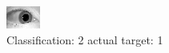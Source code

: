 \begin{figure}[h!]
\begin{center}
\includegraphics[width=0.60\columnwidth]{figures/ID1418_class_2_target_1.png}
\end{center}
\caption{ Classification: 2 actual target: 1}
\label{fig:ID1418_class_2_target_1}
\end{figure}
